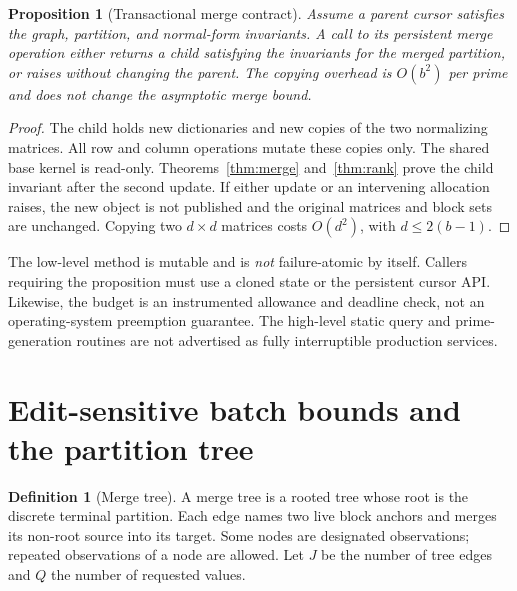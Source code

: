 \documentclass[11pt,letterpaper]{article}
\newtheorem{proposition}[theorem]{Proposition}
\theoremstyle{definition}\newtheorem{definition}[theorem]{Definition}
\theoremstyle{remark}\newtheorem{remark}[theorem]{Remark}
\newcommand{\code}[1]{\texttt{\detokenize{#1}}}
\begin{document}
\begin{proposition}[Transactional merge contract]
\label{prop:atomic}
Assume a parent cursor satisfies the graph, partition, and normal-form invariants. A call to its persistent merge operation either returns a child satisfying the invariants for the merged partition, or raises without changing the parent. The copying overhead is $O(b^2)$ per prime and does not change the asymptotic merge bound.
\end{proposition}
\begin{proof}
The child holds new dictionaries and new copies of the two normalizing matrices. All row and column operations mutate these copies only. The shared base kernel is read-only. Theorems~\ref{thm:merge} and~\ref{thm:rank} prove the child invariant after the second update. If either update or an intervening allocation raises, the new object is not published and the original matrices and block sets are unchanged. Copying two $d\times d$ matrices costs $O(d^2)$, with $d\leq2(b-1)$.
\end{proof}

The low-level \code{DynamicRank.update} method is mutable and is \emph{not} failure-atomic by itself. Callers requiring the proposition must use a cloned state or the persistent cursor API. Likewise, the budget is an instrumented allowance and deadline check, not an operating-system preemption guarantee. The high-level static query and prime-generation routines are not advertised as fully interruptible production services.

\section{Edit-sensitive batch bounds and the partition tree}
\label{sec:batch}

\begin{definition}[Merge tree]
A merge tree is a rooted tree whose root is the discrete terminal partition. Each edge names two live block anchors and merges its non-root source into its target. Some nodes are designated observations; repeated observations of a node are allowed. Let $J$ be the number of tree edges and $Q$ the number of requested values.
\end{definition}
\end{document}
